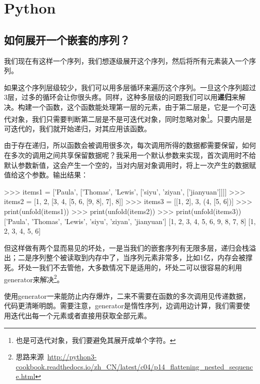 \chapter{Python}

\section{如何展开一个嵌套的序列？}

我们现在有这样一个序列，我们想逐级展开这个序列，然后将所有元素装入一个序列。

如果这个序列层级较少，我们可以用多层循环来遍历这个序列。一旦这个序列超过3层，过多的循环会让你很头疼。同样，这种多层级的问题我们可以用\textbf{递归}来解决。构建一个函数，这个函数能处理第一层的元素，由于第二层是，它是一个可迭代对象，我们只需要判断第二层是不是可迭代对象，同时忽略对象\footnote{也是可迭代对象，我们要避免其展开成单个字符。}。只要内层是可迭代的，我们就开始递归，对其应用该函数。


由于存在递归，所以函数会被调用很多次，每次调用所得的数据都需要保留，如何在多次的调用之间共享保留数据呢？我采用一个默认参数来实现，首次调用时不给默认参数新值，这会产生一个空的，当对内层对象调用时，将上一次产生的数据赋值给这个参数。输出结果：

\begin{pythoncode}
>>> items1 = ['Paula', ['Thomas', 'Lewis', ['siyu', 'ziyan', ['jianyuan']]]]
>>> items2 = [1, 2, [3, 4, [5, 6, [9, 8], 7], 8]]
>>> items3 = [[1, 2], 3, (4, [5, 6])]
>>> print(unfold(items1))
>>> print(unfold(items2))
>>> print(unfold(items3))
['Paula', 'Thomas', 'Lewis', 'siyu', 'ziyan', 'jianyuan']
[1, 2, 3, 4, 5, 6, 9, 8, 7, 8]
[1, 2, 3, 4, 5, 6]
\end{pythoncode}

但这样做有两个显而易见的坏处，一是当我们的嵌套序列有无限多层，递归会栈溢出；二是序列整个被读取到内存中了，当序列元素非常多，比如1亿，内存会被撑死。坏处一我们不去管他，大多数情况下是适用的，坏处二可以很容易的利用generator来解决\footnote{思路来源~\url{http://python3-cookbook.readthedocs.io/zh_CN/latest/c04/p14_flattening_nested_sequence.html}}。


使用generator一来能防止内存爆炸，二来不需要在函数的多次调用见传递数据，代码更清晰明朗。需要注意，generator是惰性序列，边调用边计算，我们需要使用迭代出每一个元素或者直接用获取全部元素。

